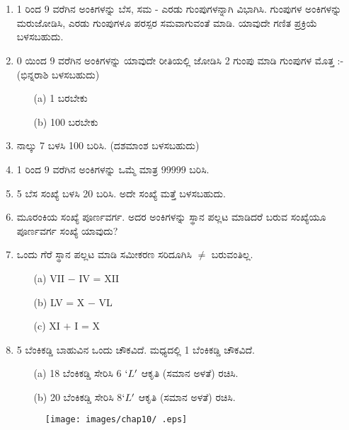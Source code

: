 \chapter{}\label{chap10}

\begin{enumerate}
\renewcommand{\labelenumi}{\bf\theenumi.}
\itemsep=5pt

\item 1 ರಿಂದ 9 ವರೆಗಿನ ಅಂಕಿಗಳನ್ನು ಬೆಸ, ಸಮ - ಎರಡು ಗುಂಪುಗಳನ್ನಾಗಿ ವಿಭಾಗಿಸಿ. ಗುಂಪುಗಳ ಅಂಕಿಗಳನ್ನು ಮರುಜೋಡಿಸಿ, ಎರಡು ಗುಂಪುಗಳೂ ಪರಸ್ಪರ ಸಮವಾಗುವಂತೆ ಮಾಡಿ. ಯಾವುದೇ ಗಣಿತ ಪ್ರಕ್ರಿಯೆ ಬಳಸಬಹುದು. 

\item 0 ಯಿಂದ 9 ವರೆಗಿನ ಅಂಕಿಗಳನ್ನು ಯಾವುದೇ ರೀತಿಯಲ್ಲಿ ಜೋಡಿಸಿ 2 ಗುಂಪು ಮಾಡಿ ಗುಂಪುಗಳ ಮೊತ್ತ :- (ಭಿನ್ನರಾಶಿ ಬಳಸಬಹುದು)
\begin{itemize}
\item[(a)] 1 ಬರಬೇಕು 
\item[(b)] 100 ಬರಬೇಕು 
\end{itemize}

\item ನಾಲ್ಕು 7 ಬಳಸಿ 100 ಬರಿಸಿ. (ದಶಮಾಂಶ ಬಳಸಬಹುದು)

\item 1 ರಿಂದ 9 ವರೆಗಿನ ಅಂಕಿಗಳನ್ನು ಒಮ್ಮೆ ಮಾತ್ರ 99999 ಬರಿಸಿ. 

\item 5 ಬೆಸ ಸಂಖ್ಯೆ ಬಳಸಿ 20 ಬರಿಸಿ. ಅದೇ ಸಂಖ್ಯೆ ಮತ್ತೆ ಬಳಸಬಹುದು. 

\item ಮೂರಂಕಿಯ ಸಂಖ್ಯೆ ಪೂರ್ಣವರ್ಗ. ಅದರ ಅಂಕಿಗಳನ್ನು ಸ್ಥಾನ ಪಲ್ಲಟ ಮಾಡಿದರೆ ಬರುವ ಸಂಖ್ಯೆಯೂ ಪೂರ್ಣವರ್ಗ ಸಂಖ್ಯೆ ಯಾವುದು? 

\item ಒಂದು ಗೆರೆ ಸ್ಥಾನ ಪಲ್ಲಟ ಮಾಡಿ ಸಮೀಕರಣ ಸರಿದೂಗಿಸಿ $\neq$ ಬರುವಂತಿಲ್ಲ. 
\begin{itemize}
\item[(a)] VII $-$ IV = XII
\item[(b)] LV = X $-$ VL
\item[(c)] XI $+$ I = X
\end{itemize}

\item 5 ಬೆಂಕಿಕಡ್ಡಿ ಬಾಹುವಿನ ಒಂದು ಚೌಕವಿದೆ. ಮಧ್ಯದಲ್ಲಿ 1 ಬೆಂಕಿಕಡ್ಡಿ  ಚೌಕವಿದೆ. 
\begin{itemize}
\item[(a)] 18 ಬೆಂಕಿಕಡ್ಡಿ ಸೇರಿಸಿ 6 $`L'$ ಆಕೃತಿ (ಸಮಾನ ಅಳತೆ) ರಚಿಸಿ. 
\item[(b)] 20 ಬೆಂಕಿಕಡ್ಡಿ ಸೇರಿಸಿ 8$`L'$ ಆಕೃತಿ (ಸಮಾನ ಅಳತೆ) ರಚಿಸಿ. 
\end{itemize}

\begin{figure}[!h]
\centering
\texttt{[image: images/chap10/ .eps]}
\end{figure}


\end{enumerate}
